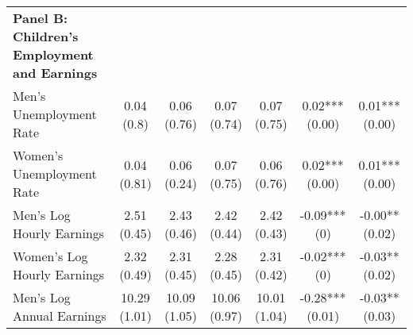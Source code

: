 \begin{landscape}
\begin{ThreePartTable}
\begin{longtable}[t]{>{\raggedright\arraybackslash}p{5cm}cccccc}
\textbf{Panel B: Children's Employment and Earnings} & \textbf{} & \textbf{} & \textbf{} & \textbf{} & \textbf{} & \textbf{}\\
\hspace{1em}Men’s Unemployment Rate & \specialcell{0.04\\(0.8)} & \specialcell{0.06\\(0.76)} & \specialcell{0.07\\(0.74)} & \specialcell{0.07\\(0.75)} & \specialcell{0.02***\\(0.00)} & \specialcell{0.01***\\(0.00)}\\
\hspace{1em}Women’s Unemployment Rate & \specialcell{0.04\\(0.81)} & \specialcell{0.06\\(0.24)} & \specialcell{0.07\\(0.75)} & \specialcell{0.06\\(0.76)} & \specialcell{0.02***\\(0.00)} & \specialcell{0.01***\\(0.00)}\\
\hspace{1em}Men’s Log Hourly Earnings & \specialcell{2.51\\(0.45)} & \specialcell{2.43\\(0.46)} & \specialcell{2.42\\(0.44)} & \specialcell{2.42\\(0.43)} & \specialcell{-0.09***\\(0)} & \specialcell{-0.00**\\(0.02)}\\
\addlinespace
\hspace{1em}Women’s Log Hourly Earnings & \specialcell{2.32\\(0.49)} & \specialcell{2.31\\(0.45)} & \specialcell{2.28\\(0.45)} & \specialcell{2.31\\(0.42)} & \specialcell{-0.02***\\(0)} & \specialcell{-0.03**\\(0.02)}\\
\hspace{1em}Men’s Log Annual Earnings & \specialcell{10.29\\(1.01)} & \specialcell{10.09\\(1.05)} & \specialcell{10.06\\(0.97)} & \specialcell{10.01\\(1.04)} & \specialcell{-0.28***\\(0.01)} & \specialcell{-0.03**\\(0.03)}\\

\end{longtable}
\end{ThreePartTable}
\end{landscape}
